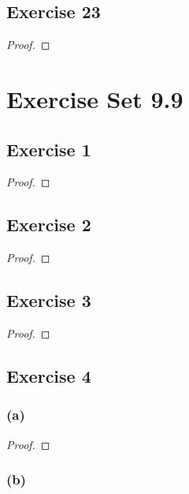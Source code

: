\documentclass[14pt]{extarticle}
\begin{document}
\subsection{Exercise 23}

\begin{proof}

\end{proof}

\section{Exercise Set 9.9}

\subsection{Exercise 1}

\begin{proof}

\end{proof}

\subsection{Exercise 2}

\begin{proof}

\end{proof}

\subsection{Exercise 3}

\begin{proof}

\end{proof}

\subsection{Exercise 4}

\subsubsection{(a)}

\begin{proof}

\end{proof}

\subsubsection{(b)}
\end{document}
